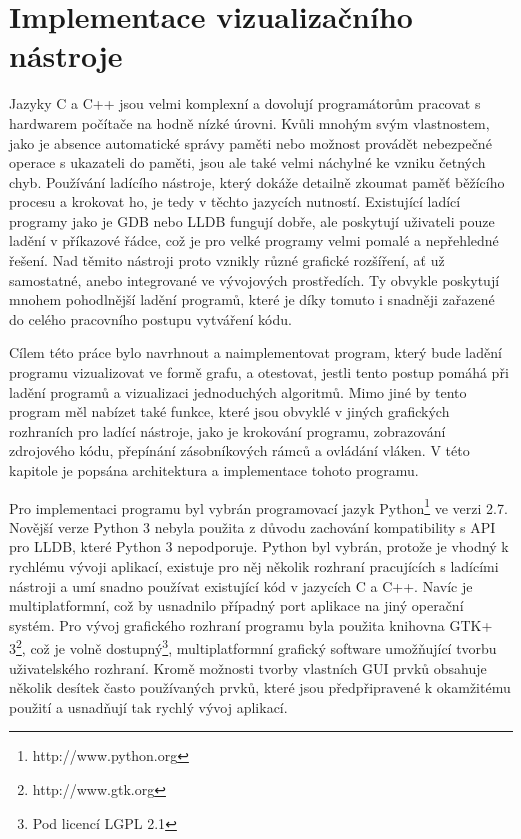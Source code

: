 \documentclass[bc,male,java,dept460]{diploma}						%
\begin{document}
\section{Implementace vizualizačního nástroje}
	Jazyky C a C++ jsou velmi komplexní a dovolují programátorům pracovat s hardwarem počítače na hodně nízké úrovni. Kvůli mnohým svým vlastnostem,
	jako je absence automatické správy paměti nebo možnost provádět nebezpečné operace s ukazateli do paměti, jsou ale také velmi náchylné ke vzniku
	četných chyb. Používání ladícího nástroje, který dokáže detailně zkoumat paměť běžícího procesu a krokovat ho, je tedy v těchto jazycích nutností.
	Existující ladící programy jako je GDB nebo LLDB fungují dobře, ale poskytují uživateli pouze ladění v příkazové řádce, což je pro velké programy
	velmi pomalé a nepřehledné řešení. Nad těmito nástroji proto vznikly různé grafické rozšíření, ať už samostatné, anebo integrované ve vývojových
	prostředích. Ty obvykle poskytují mnohem pohodlnější ladění programů, které je díky tomuto i snadněji zařazené do celého pracovního postupu vytváření
	kódu.
	
	\vspace{5mm}
	
	\par Cílem této práce bylo navrhnout a naimplementovat program, který bude ladění programu vizualizovat ve formě grafu, a otestovat, jestli tento
	postup pomáhá při ladění programů a vizualizaci jednoduchých algoritmů. Mimo jiné by tento program měl nabízet také funkce, které jsou obvyklé v jiných
	grafických rozhraních pro ladící nástroje, jako je krokování programu, zobrazování zdrojového kódu, přepínání zásobníkových rámců a ovládání vláken.
	V této kapitole je popsána architektura a implementace tohoto programu.
	
	\vspace{5mm}
	
	\par Pro implementaci programu byl vybrán programovací jazyk Python\footnote{http://www.python.org} ve verzi 2.7. Novější verze Python 3 nebyla použita
	z důvodu zachování kompatibility s API pro LLDB, které Python 3 nepodporuje. Python byl vybrán, protože je vhodný k rychlému vývoji aplikací, existuje pro
	něj několik rozhraní pracujících s ladícími nástroji a umí snadno používat existující kód v jazycích C a C++. Navíc je multiplatformní, což by usnadnilo
	případný port aplikace na jiný operační systém. Pro vývoj grafického rozhraní programu byla použita knihovna GTK+ 3\footnote{http://www.gtk.org}, což je
	volně dostupný\footnote{Pod licencí LGPL 2.1}, multiplatformní grafický software umožňující tvorbu uživatelského rozhraní. Kromě možnosti tvorby vlastních
	GUI prvků obsahuje několik desítek často používaných prvků, které jsou předpřipravené k okamžitému použití a usnadňují tak rychlý vývoj aplikací.
\end{document}
